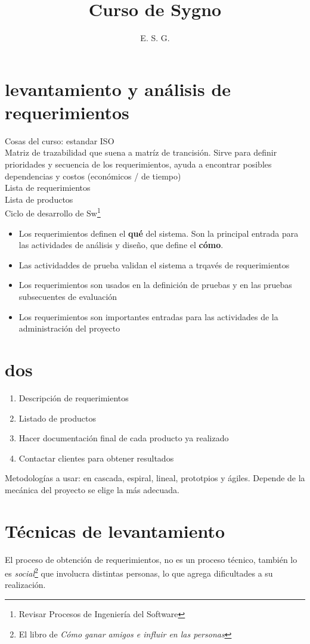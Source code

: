 \documentclass[12pt]{article} %
\title{Curso de Sygno}
\author{E. S. G.}
\begin{document}
\maketitle

\section{levantamiento y análisis de requerimientos}
Cosas del curso:
estandar ISO\\
Matriz de trazabilidad que suena a matríz de trancisión. Sirve para definir prioridades y secuencia de los requerimientos, ayuda a encontrar posibles dependencias y costos (económicos / de tiempo)\\
Lista de requerimientos\\
Lista de productos\\
Ciclo de desarrollo de Sw\footnote{Revisar Procesos de Ingeniería del Software}\\
\begin{itemize}
\item Los requerimientos definen el \textbf{qué} del sistema. Son la principal entrada para las actividades de análisis y diseño, que define el \textbf{cómo}.
\item Las actividaddes de prueba validan el sistema a trqavés de requerimientos
\item Los requerimientos son usados en la definición de pruebas y en las pruebas subsecuentes de evaluación
\item Los requerimientos son importantes entradas para las actividades de la administración del proyecto
\end{itemize}
\section{dos}
\begin{enumerate}
\item Descripción de requerimientos
\item Listado de productos
\item Hacer documentación final de cada producto ya realizado
\item Contactar clientes para obtener resultados
\end{enumerate}

Metodologías a usar: en cascada, espiral, lineal, prototpios y ágiles. Depende de la mecánica del proyecto se elige la más adecuada.

\section{Técnicas de levantamiento}
El proceso de obtención de requerimientos, no es un proceso técnico, también lo es \emph{social}\footnote{El libro de \emph{Cómo ganar amigos e influir en las personas}} que involucra distintas personas, lo que agrega dificultades a su realización.\\
\end{document}
